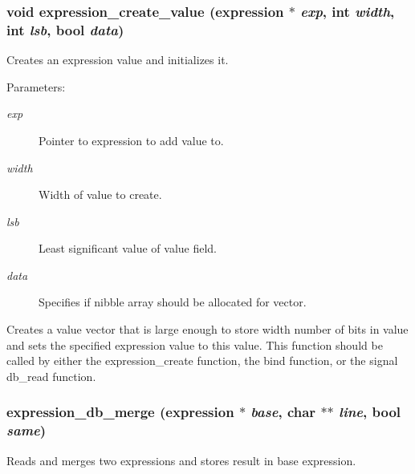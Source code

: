 \subsubsection{\setlength{\rightskip}{0pt plus 5cm}void expression\_\-create\_\-value ({\bf expression} $\ast$ {\em exp}, int {\em width}, int {\em lsb}, {\bf bool} {\em data})}\label{expr_8h_a0}


Creates an expression value and initializes it. 

\begin{Desc}
\item[Parameters:]
\begin{description}
\item[{\em exp}]Pointer to expression to add value to. \item[{\em width}]Width of value to create. \item[{\em lsb}]Least significant value of value field. \item[{\em data}]Specifies if nibble array should be allocated for vector.\end{description}
\end{Desc}
Creates a value vector that is large enough to store width number of bits in value and sets the specified expression value to this value. This function should be called by either the expression\_\-create function, the bind function, or the signal db\_\-read function. 
\subsubsection{ expression\_\-db\_\-merge ({\bf expression} $\ast$ {\em base}, char $\ast$$\ast$ {\em line}, {\bf bool} {\em same})}\label{expr_8h_a8}


Reads and merges two expressions and stores result in base expression. 


